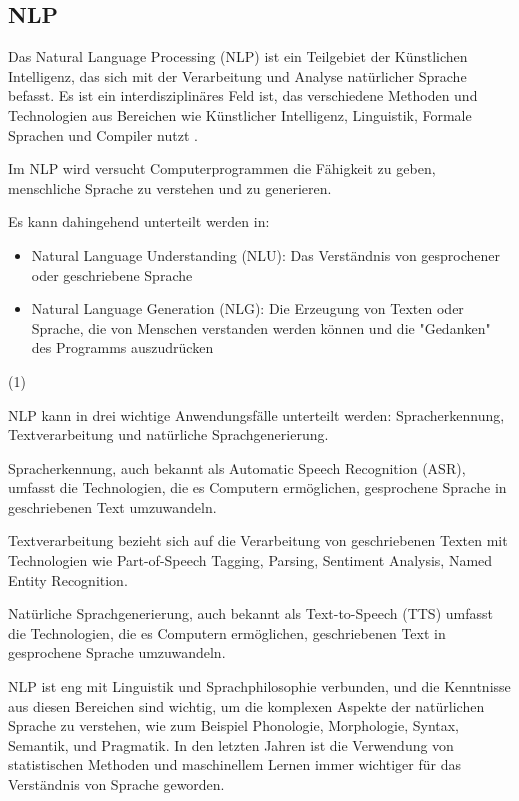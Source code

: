 \documentclass[oneside,bibliography=totocnumbered,BCOR=5mm]{scrbook}%
\theoremstyle{definition}
\theoremstyle{definition}
\theoremstyle{definition}
\theoremstyle{definition}
\theoremstyle{definition}
\theoremstyle{definition}
\begin{document}
\subsection{NLP}

Das Natural Language Processing (NLP) ist ein Teilgebiet der Künstlichen Intelligenz, 
das sich mit der Verarbeitung und Analyse natürlicher Sprache befasst. 
Es ist ein interdisziplinäres Feld ist, das verschiedene Methoden und Technologien aus Bereichen wie Künstlicher Intelligenz, 
Linguistik, Formale Sprachen und Compiler nutzt \autocite{NLPfundamentals}.


Im NLP wird versucht Computerprogrammen die Fähigkeit zu geben, menschliche Sprache zu verstehen und zu generieren.

Es kann dahingehend unterteilt werden in:
\begin{itemize}
  \item Natural Language Understanding (NLU): Das Verständnis von gesprochener oder geschriebene Sprache \autocite{NLPfundamentals}
  \item Natural Language Generation (NLG): Die Erzeugung von Texten oder Sprache, die von Menschen verstanden werden können
  und die "Gedanken" des Programms auszudrücken \autocite{NLPfundamentals}
\end{itemize} 
(1) 

NLP kann in drei wichtige Anwendungsfälle unterteilt werden: Spracherkennung, Textverarbeitung und natürliche Sprachgenerierung.


Spracherkennung, auch bekannt als Automatic Speech Recognition (ASR), umfasst die Technologien, 
die es Computern ermöglichen, gesprochene Sprache in geschriebenen Text umzuwandeln.


Textverarbeitung bezieht sich auf die Verarbeitung von geschriebenen Texten mit Technologien wie Part-of-Speech Tagging, 
Parsing, Sentiment Analysis, Named Entity Recognition.


Natürliche Sprachgenerierung, auch bekannt als Text-to-Speech (TTS) umfasst die Technologien, 
die es Computern ermöglichen, geschriebenen Text in gesprochene Sprache umzuwandeln.


NLP ist eng mit Linguistik und Sprachphilosophie verbunden, 
und die Kenntnisse aus diesen Bereichen sind wichtig, um die komplexen Aspekte der natürlichen Sprache zu verstehen, 
wie zum Beispiel Phonologie, Morphologie, Syntax, Semantik, und Pragmatik.
In den letzten Jahren ist die Verwendung von statistischen Methoden und 
maschinellem Lernen immer wichtiger für das Verständnis von Sprache geworden.
\end{document}
